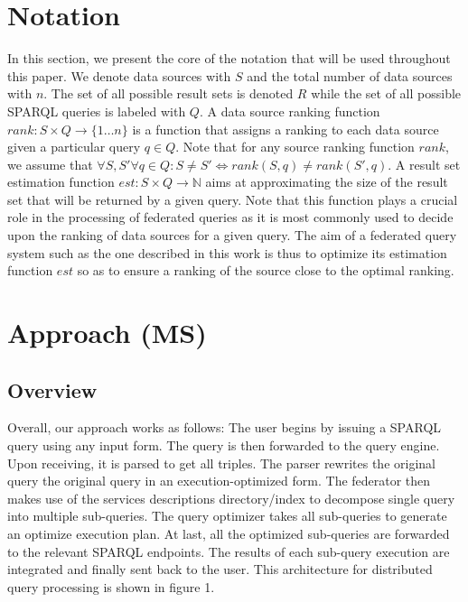 \documentclass{sig-alternate}  %
\begin{document}
\section{Notation}
In this section, we present the core of the notation that will be used throughout this paper.
We denote data sources with $S$ and the total number of data sources with $n$. 
The set of all possible result sets is denoted $R$ while the set of all possible SPARQL queries is labeled with $Q$. 
A data source ranking function $rank: S \times Q \rightarrow \{1 \ldots n\}$ is a function that assigns a ranking to each data source given a particular query $q \in Q$.
Note that for any source ranking function $rank$, we assume that $\forall S, S' \forall q \in Q : S  \neq S' \Longleftrightarrow rank(S, q) \neq rank (S', q)$.
A result set estimation function $est: S \times Q \rightarrow \mathbb{N}$ aims at approximating the size of the result set that will be returned by a given query.
Note that this function plays a crucial role in the processing of federated queries as it is most commonly used to decide upon the ranking of data sources for a given query.
The aim of a federated query system such as the one described in this work is thus to optimize its estimation function $est$ so as to ensure a ranking of the source close to the optimal ranking. %
\section{Approach (MS)}
\subsection{Overview}
 Overall, our approach works as follows: The user begins by issuing
a SPARQL query using any input form. The query is then forwarded to
the query engine. Upon receiving, it is parsed to get all triples.
The parser rewrites the original query the original query in an execution-optimized
form. The federator then makes use of the services descriptions directory/index
to decompose single query into multiple sub-queries. The query optimizer
takes all sub-queries to generate an optimize execution plan. At last,
all the optimized sub-queries are forwarded to the relevant SPARQL
endpoints. The results of each sub-query execution are integrated and finally sent
back to the user. This architecture for distributed query processing
is shown in figure 1.
\end{document}
